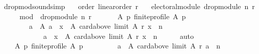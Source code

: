 \begin{isabellebody}
\isadelimdocument
%
\endisadelimdocument
%
\isatagdocument
%
\isamarkuptrue%
%
\endisatagdocument
{\isafolddocument}%
%
\isadelimdocument
%
\endisadelimdocument
{}\isamarkupfalse%
\ drop{\isacharunderscore}{\kern0pt}mod{\isacharunderscore}{\kern0pt}sound{\isacharbrackleft}{\kern0pt}simp{\isacharbrackright}{\kern0pt}{\isacharcolon}{\kern0pt}\isanewline
\ \ \ order{\isacharcolon}{\kern0pt}\ {\isachardoublequoteopen}linear{\isacharunderscore}{\kern0pt}order\ r{\isachardoublequoteclose}\isanewline
\ \ \ {\isachardoublequoteopen}electoral{\isacharunderscore}{\kern0pt}module\ {\isacharparenleft}{\kern0pt}drop{\isacharunderscore}{\kern0pt}module\ n\ r{\isacharparenright}{\kern0pt}{\isachardoublequoteclose}\isanewline
%
\isadelimproof
%
\endisadelimproof
%
\isatagproof
{}\isamarkupfalse%
\ {\isacharminus}{\kern0pt}\isanewline
\ \ \isamarkupfalse%
\ {\isacharquery}{\kern0pt}mod\ {\isacharequal}{\kern0pt}\ {\isachardoublequoteopen}drop{\isacharunderscore}{\kern0pt}module\ n\ r{\isachardoublequoteclose}\isanewline
\ \ \isamarkupfalse%
\isanewline
\ \ \ \ {\isachardoublequoteopen}{\isasymforall}A\ p{\isachardot}{\kern0pt}\ finite{\isacharunderscore}{\kern0pt}profile\ A\ p\ {\isasymlongrightarrow}\isanewline
\ \ \ \ \ \ \ \ {\isacharparenleft}{\kern0pt}{\isasymforall}a\ {\isasymin}\ A{\isachardot}{\kern0pt}\ a\ {\isasymin}\ {\isacharbraceleft}{\kern0pt}x\ {\isasymin}\ A{\isachardot}{\kern0pt}\ card{\isacharparenleft}{\kern0pt}above\ {\isacharparenleft}{\kern0pt}limit\ A\ r{\isacharparenright}{\kern0pt}\ x{\isacharparenright}{\kern0pt}\ {\isasymle}\ n{\isacharbraceright}{\kern0pt}\ {\isasymor}\isanewline
\ \ \ \ \ \ \ \ \ \ \ \ a\ {\isasymin}\ {\isacharbraceleft}{\kern0pt}x\ {\isasymin}\ A{\isachardot}{\kern0pt}\ card{\isacharparenleft}{\kern0pt}above\ {\isacharparenleft}{\kern0pt}limit\ A\ r{\isacharparenright}{\kern0pt}\ x{\isacharparenright}{\kern0pt}\ {\isachargreater}{\kern0pt}\ n{\isacharbraceright}{\kern0pt}{\isacharparenright}{\kern0pt}{\isachardoublequoteclose}\isanewline
\ \ \ \ \isamarkupfalse%
\ auto\isanewline
\ \ \isamarkupfalse%
\isanewline
\ \ \ \ {\isachardoublequoteopen}{\isasymforall}A\ p{\isachardot}{\kern0pt}\ finite{\isacharunderscore}{\kern0pt}profile\ A\ p\ {\isasymlongrightarrow}\isanewline
\ \ \ \ \ \ \ \ {\isacharbraceleft}{\kern0pt}a\ {\isasymin}\ A{\isachardot}{\kern0pt}\ card{\isacharparenleft}{\kern0pt}above\ {\isacharparenleft}{\kern0pt}limit\ A\ r{\isacharparenright}{\kern0pt}\ a{\isacharparenright}{\kern0pt}\ {\isasymle}\ n{\isacharbraceright}{\kern0pt}\ {\isasymunion}\isanewline

\end{isabellebody}

